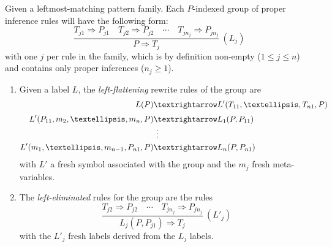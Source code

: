 \documentclass[11pt]{article} %
\begin{document}

\begin{definition}
  Given a leftmost-matching pattern family. Each $P$-indexed group of proper inference rules will
  have the following form:
  \begin{displaymath}
    \dfrac{ T_{j1} ⇒ P_{j1} \quad T_{j2} ⇒ P_{j2} \quad\cdots\quad T_{jn_j} ⇒ P_{jn_j} }{ P ⇒ T_j } ~ (L_j)
  \end{displaymath}
  with one $j$ per rule in the family, which is by definition non-empty ($1≤j≤n$) and contains only
  proper inferences ($n_j≥1$).
  \begin{enumerate}

  \item Given a label $L$, the \emph{left-flattening} rewrite rules of the group are
    \begin{align*}
      L(P) &→ L'(T_{11}, …,T_{n1}, P) \\[\jot]
      L'(P_{11}, m_2, …, m_n, P) &→ L_1(P, P_{11}) \\[-\jot]
      &~\vdots\\
      L'(m_1, …, m_{n-1}, P_{n1}, P) &→ L_n(P, P_{n1})
    \end{align*}
    with $L'$ a fresh symbol associated with the group and the $m_j$ fresh meta-variables.

  \item The \emph{left-eliminated} rules for the group are the rules
    \begin{displaymath}
      \dfrac{ T_{j2} ⇒ P_{j2} \quad\cdots\quad T_{jn_j} ⇒ P_{jn_j} }{ L_j(P, P_{j1}) ⇒ T_j } ~ (L'_j)
    \end{displaymath}
    with the $L'_j$ fresh labels derived from the $L_j$ labels.

  \end{enumerate}
\end{definition}
\end{document}
